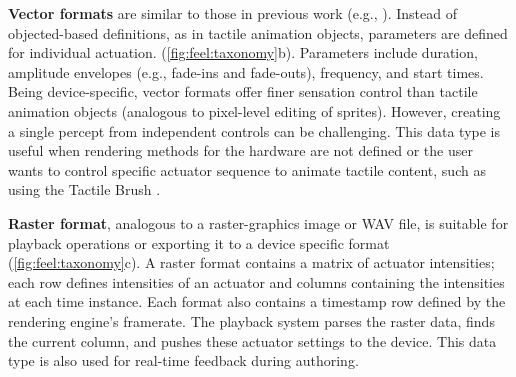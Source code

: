
\textbf{Vector formats} are similar to those in previous work (e.g., \cite{Enriquez2003}).
Instead of objected-based definitions, as in tactile animation objects, parameters are defined for individual actuation. %
(\autoref{fig:feel:taxonomy}b).
Parameters include duration, amplitude envelopes (e.g., fade-ins and fade-outs), frequency, and start times.
Being device-specific, vector formats %
offer finer sensation control than tactile animation objects (analogous to pixel-level editing of sprites).
However, creating a single percept from independent controls can be challenging.
This data type is useful when rendering methods for the hardware are not defined or the user wants to control specific actuator sequence to animate tactile content, such as using the Tactile Brush \cite{Israr2011a}. 

\textbf{Raster format}, analogous to a raster-graphics image or WAV file, is suitable for playback operations or exporting it to a device specific format (\autoref{fig:feel:taxonomy}c).
A raster format contains a matrix of actuator intensities; each row defines intensities of an actuator and columns containing the intensities at each time instance. Each format also contains a timestamp row defined by the rendering engine's framerate.  
The playback system parses the raster data, finds the current column, and pushes these actuator settings to the device. %
This data type is also used for real-time feedback during authoring.



